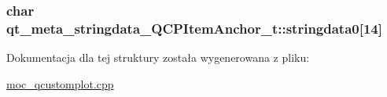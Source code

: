 \subsubsection[{\texorpdfstring{stringdata0}{stringdata0}}]{\setlength{\rightskip}{0pt plus 5cm}char qt\+\_\+meta\+\_\+stringdata\+\_\+\+Q\+C\+P\+Item\+Anchor\+\_\+t\+::stringdata0\mbox{[}14\mbox{]}}\hypertarget{structqt__meta__stringdata___q_c_p_item_anchor__t_aafbba7dee657bf2d44a9148e9e2c6b48}{}\label{structqt__meta__stringdata___q_c_p_item_anchor__t_aafbba7dee657bf2d44a9148e9e2c6b48}


Dokumentacja dla tej struktury została wygenerowana z pliku\+:\begin{DoxyCompactItemize}
\item 
\hyperlink{moc__qcustomplot_8cpp}{moc\+\_\+qcustomplot.\+cpp}\end{DoxyCompactItemize}
